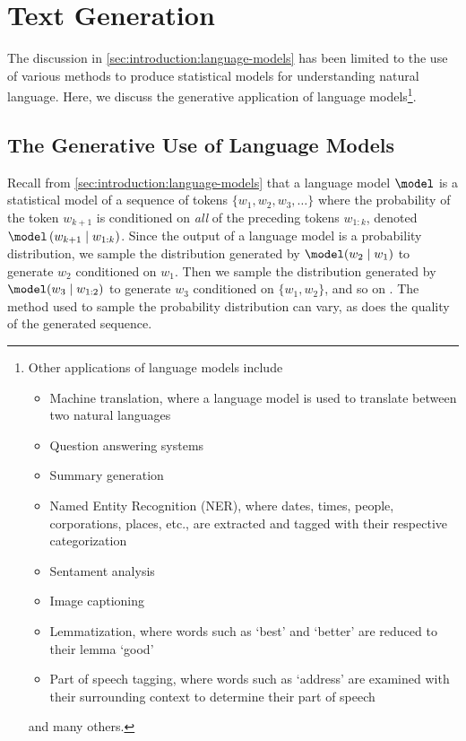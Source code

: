 \section{Text Generation}\label{sec:introduction:text-generation}

The discussion in \autoref{sec:introduction:language-models} has been limited to the use of various methods to produce statistical models for understanding natural language.
Here, we discuss the generative application of language models\footnote{
    Other applications of language models include
    \begin{itemize}
        \item Machine translation, where a language model is used to translate between two natural languages
        \item Question answering systems
        \item Summary generation
        \item Named Entity Recognition (NER), where dates, times, people, corporations, places, etc., are extracted and tagged with their respective categorization
        \item Sentament analysis
        \item Image captioning
        \item Lemmatization, where words such as `best' and `better' are reduced to their lemma `good'
        \item Part of speech tagging, where words such as `address' are examined with their surrounding context to determine their part of speech
    \end{itemize}
    and many others.
}.

\subsection{The Generative Use of Language Models}\label{sec:text-generation:language-models}

Recall from \autoref{sec:introduction:language-models} that a language model $\model$ is a statistical model of a sequence of tokens $\{w_1, w_2, w_3, \dots\}$ where the probability of the token $w_{k+1}$ is conditioned on \textit{all} of the preceding tokens $w_{1:k}$, denoted $\model\left(w_{k+1} \mid w_{1:k}\right)$.
Since the output of a language model is a probability distribution, we sample the distribution generated by $\model(w_2 \mid w_1)$ to generate $w_2$ conditioned on $w_1$.
Then we sample the distribution generated by $\model(w_3 \mid w_{1:2})$ to generate $w_3$ conditioned on $\{w_1, w_2\}$, and so on \cite{goldberg_2017}.
The method used to sample the probability distribution can vary, as does the quality of the generated sequence.

